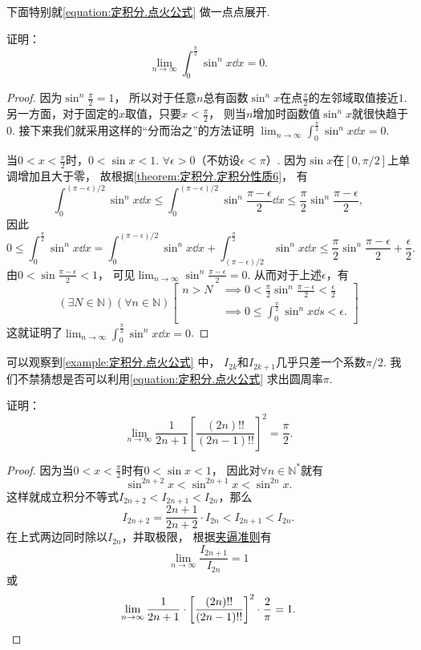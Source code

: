 下面特别就\cref{equation:定积分.点火公式} 做一点点展开.
\begin{example}
证明：\begin{equation}
	\lim_{n\to\infty} \int_0^{\frac\pi2} \sin^n x \dd{x} = 0.
\end{equation}
\begin{proof}
因为\(\sin^n\frac{\pi}{2}=1\)，
所以对于任意\(n\)总有函数\(\sin^n x\)在点\(\frac{\pi}{2}\)的左邻域取值接近\(1\).
另一方面，对于固定的\(x\)取值，只要\(x<\frac{\pi}{2}\)，
则当\(n\)增加时函数值\(\sin^n x\)就很快趋于\(0\).
接下来我们就采用这样的“分而治之”的方法证明
\(\lim_{n\to\infty} \int_0^{\frac\pi2} \sin^n x \dd{x} = 0\).

当\(0<x<\frac{\pi}{2}\)时，\(0<\sin x<1\).
\(\forall\epsilon>0\)（不妨设\(\epsilon<\pi\)）.
因为\(\sin x\)在\([0,\pi/2]\)上单调增加且大于零，
故根据\cref{theorem:定积分.定积分性质6}，
有\[
	\int_0^{(\pi-\epsilon)/2} \sin^n x \dd{x}
	\leq
	\int_0^{(\pi-\epsilon)/2} \sin^n\frac{\pi-\epsilon}{2} \dd{x}
	\leq
	\frac{\pi}{2} \sin^n\frac{\pi-\epsilon}{2},
\]
因此\[
	0 \leq \int_0^{\frac\pi2} \sin^n x \dd{x}
	= \int_0^{(\pi-\epsilon)/2} \sin^n x \dd{x}
	+ \int_{(\pi-\epsilon)/2}^{\frac\pi2} \sin^n x \dd{x}
	\leq \frac{\pi}{2} \sin^n\frac{\pi-\epsilon}{2} + \frac{\epsilon}{2}.
\]
由\(0<\sin\frac{\pi-\epsilon}{2}<1\)，
可见\(\lim_{n\to\infty} \sin^n\frac{\pi-\epsilon}{2} = 0\).
从而对于上述\(\epsilon\)，有\[
	(\exists N\in\mathbb{N})
	(\forall n\in\mathbb{N})
	\left[
		\begin{array}{ll}
			n>N
			&\implies
			0<\frac{\pi}{2} \sin^n\frac{\pi-\epsilon}{2}<\frac{\epsilon}{2} \\
			&\implies
			0 \leq \int_0^{\frac\pi2} \sin^n x \dd{s} < \epsilon.
		\end{array}
	\right]
\]
这就证明了\(\lim_{n\to\infty} \int_0^{\frac\pi2} \sin^n x \dd{x} = 0\).
\end{proof}
\end{example}

可以观察到\cref{example:定积分.点火公式} 中，
\(I_{2k}\)和\(I_{2k+1}\)几乎只差一个系数\(\pi/2\).
我们不禁猜想是否可以利用\cref{equation:定积分.点火公式} 求出圆周率\(\pi\).
\begin{example}[沃利斯公式]
证明：\begin{equation}\label{equation:定积分.沃利斯公式}
	\lim_{n\to\infty} \frac{1}{2n+1} \left[
		\frac{(2n)!!}{(2n-1)!!}
	\right]^2
	= \frac{\pi}{2}.
\end{equation}
\begin{proof}
因为当\(0<x<\frac{\pi}{2}\)时有\(0<\sin x<1\)，
因此对\(\forall n\in\mathbb{N}^*\)就有\[
	\sin^{2n+2} x < \sin^{2n+1} x < \sin^{2n} x.
\]
这样就成立积分不等式\(I_{2n+2} < I_{2n+1} < I_{2n}\)，那么\[
	I_{2n+2} = \frac{2n+1}{2n+2} \cdot I_{2n}
	< I_{2n+1} < I_{2n}.
\]
在上式两边同时除以\(I_{2n}\)，并取极限，
根据\hyperref[theorem:函数极限.夹逼准则]{夹逼准则}有\[
	\lim_{n\to\infty} \frac{I_{2n+1}}{I_{2n}} = 1
\]
或\[
	\lim_{n\to\infty} \frac{1}{2n+1} \cdot \left[
		\frac{(2n)!!}{(2n-1)!!}
	\right]^2 \cdot \frac{2}{\pi}
	= 1.
	\qedhere
\]
\end{proof}
\end{example}

